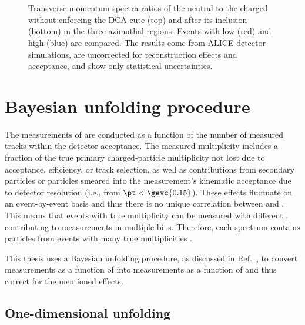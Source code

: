 \begin{figure}%
\\
\\
\caption{Transverse momentum spectra ratios of the neutral \KOs to the charged \kpm without enforcing the DCA cute (top) and after its inclusion (bottom) in the three azimuthal regions. Events with low \NT (red) and high \NT (blue) are compared. The results come from ALICE detector simulations, are uncorrected for reconstruction effects and acceptance, and show only statistical uncertainties.}
\label{fig:rt:KtoK}
\end{figure}



\section{Bayesian unfolding procedure}

The measurements of \VOs are conducted as a function of the number of measured tracks \NTm within the detector acceptance. The measured multiplicity \NTm includes a fraction of the true primary charged-particle multiplicity \NTt not lost due to acceptance, efficiency, or track selection, as well as contributions from secondary particles or particles smeared into the measurement's kinematic acceptance due to detector resolution (i.e., from $\pt < \gevc{0.15}$). These effects fluctuate on an event-by-event basis and thus there is no unique correlation between \NTm and \NTt. This means that events with true multiplicity \NTt can be measured with different \NTm, contributing to \VO measurements in multiple \NTm bins. Therefore, each spectrum contains particles from events with many true multiplicities \NTt.

This thesis uses a Bayesian unfolding procedure, as discussed in Ref.~\cite{dagostiniMultidimensionalUnfoldingMethod1995}, to convert \VOs measurements as a function of \NTm into measurements as a function of \NTt and thus correct for the mentioned effects.

\subsection{One-dimensional unfolding}

